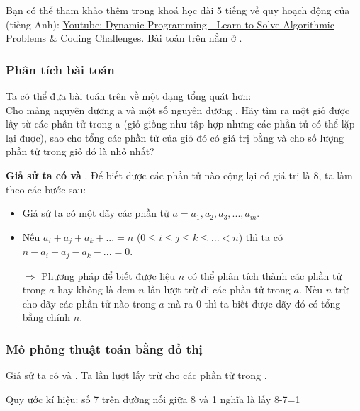 \documentclass[main.tex]{subfiles}
\begin{document}
Bạn có thể tham khảo thêm trong khoá học dài 5 tiếng về quy hoạch động của  (tiếng Anh): \href{https://www.youtube.com/watch?v=oBt53YbR9Kk}{Youtube: Dynamic Programming - Learn to Solve Algorithmic Problems \& Coding Challenges}. Bài toán trên nằm ở .

\subsubsection{Phân tích bài toán}
Ta có thể đưa bài toán trên về một dạng tổng quát hơn:\\
Cho mảng nguyên dương \code a và một số nguyên dương . Hãy tìm ra một giỏ được lấy từ các phần tử trong \code a (giỏ giống như tập hợp nhưng các phần tử có thể lặp lại được), sao cho tổng các phần tử của giỏ đó có giá trị bằng  và cho số lượng phần tử trong giỏ đó là nhỏ nhất?

\textbf{Giả sử ta có  và }. Để biết được các phần tử nào cộng lại có giá trị là 8, ta làm theo các bước sau:
\begin{itemize}
    \item Giả sử ta có một dãy các phần tử  $a = {a_1, a_2, a_3, ..., a_m}$.
    \item Nếu $a_i+a_j+a_k+...=n$ ($0 \le i \le j \le k \le ... < n $) thì ta có $n-a_i-a_j-a_k-...=0$.\par
    $\Rightarrow$ Phương pháp để biết được liệu $n$ có thể phân tích thành các phần tử trong $a$ hay không là đem $n$ lần lượt trừ đi các phần tử trong $a$. Nếu $n$ trừ cho dãy các phần tử nào trong $a$ mà ra $0$ thì ta biết được dãy đó có tổng bằng chính $n$.
\end{itemize}

\subsubsection{Mô phỏng thuật toán bằng đồ thị}
Giả sử ta có  và .
Ta lần lượt lấy  trừ cho các phần tử trong .

\begin{center}
\par Quy ước kí hiệu: số 7 trên đường nối giữa 8 và 1 nghĩa là lấy 8-7=1
\end{center}
\end{document}
